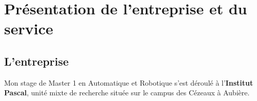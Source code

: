 \documentclass[12pt,a4paper,oneside]{report}
\begin{document}

\newpage

\thispagestyle{empty}
\tableofcontents

\newpage


\chapter{Présentation de l'entreprise et du service}

\vspace{1cm}

\section{L'entreprise}
Mon stage de Master 1 en Automatique et Robotique s'est déroulé à l'\textbf{Institut Pascal}, unité mixte de recherche située sur le campus des Cézeaux à Aubière.
\end{document}
